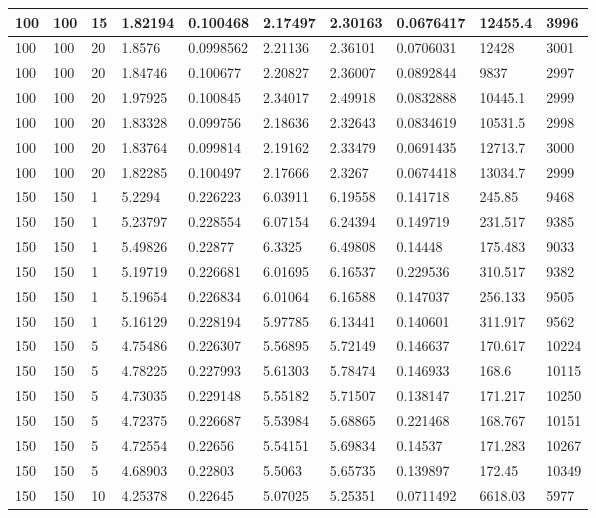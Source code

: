 \begin{landscape}
\begin{longtable}{ | l | l | l | l | l | l | l | l | l | l | }
100 & 100 & 15 & 1.82194 & 0.100468 & 2.17497 & 2.30163 & 0.0676417 & 12455.4 & 3996\\ \hline
100 & 100 & 20 & 1.8576 & 0.0998562 & 2.21136 & 2.36101 & 0.0706031 & 12428 & 3001\\ \hline
100 & 100 & 20 & 1.84746 & 0.100677 & 2.20827 & 2.36007 & 0.0892844 & 9837 & 2997\\ \hline
100 & 100 & 20 & 1.97925 & 0.100845 & 2.34017 & 2.49918 & 0.0832888 & 10445.1 & 2999\\ \hline
100 & 100 & 20 & 1.83328 & 0.099756 & 2.18636 & 2.32643 & 0.0834619 & 10531.5 & 2998\\ \hline
100 & 100 & 20 & 1.83764 & 0.099814 & 2.19162 & 2.33479 & 0.0691435 & 12713.7 & 3000\\ \hline
100 & 100 & 20 & 1.82285 & 0.100497 & 2.17666 & 2.3267 & 0.0674418 & 13034.7 & 2999\\ \hline
150 & 150 & 1 & 5.2294 & 0.226223 & 6.03911 & 6.19558 & 0.141718 & 245.85 & 9468\\ \hline
150 & 150 & 1 & 5.23797 & 0.228554 & 6.07154 & 6.24394 & 0.149719 & 231.517 & 9385\\ \hline
150 & 150 & 1 & 5.49826 & 0.22877 & 6.3325 & 6.49808 & 0.14448 & 175.483 & 9033\\ \hline
150 & 150 & 1 & 5.19719 & 0.226681 & 6.01695 & 6.16537 & 0.229536 & 310.517 & 9382\\ \hline
150 & 150 & 1 & 5.19654 & 0.226834 & 6.01064 & 6.16588 & 0.147037 & 256.133 & 9505\\ \hline
150 & 150 & 1 & 5.16129 & 0.228194 & 5.97785 & 6.13441 & 0.140601 & 311.917 & 9562\\ \hline
150 & 150 & 5 & 4.75486 & 0.226307 & 5.56895 & 5.72149 & 0.146637 & 170.617 & 10224\\ \hline
150 & 150 & 5 & 4.78225 & 0.227993 & 5.61303 & 5.78474 & 0.146933 & 168.6 & 10115\\ \hline
150 & 150 & 5 & 4.73035 & 0.229148 & 5.55182 & 5.71507 & 0.138147 & 171.217 & 10250\\ \hline
150 & 150 & 5 & 4.72375 & 0.226687 & 5.53984 & 5.68865 & 0.221468 & 168.767 & 10151\\ \hline
150 & 150 & 5 & 4.72554 & 0.22656 & 5.54151 & 5.69834 & 0.14537 & 171.283 & 10267\\ \hline
150 & 150 & 5 & 4.68903 & 0.22803 & 5.5063 & 5.65735 & 0.139897 & 172.45 & 10349\\ \hline
150 & 150 & 10 & 4.25378 & 0.22645 & 5.07025 & 5.25351 & 0.0711492 & 6618.03 & 5977\\ \hline

\end{longtable}
\end{landscape}
